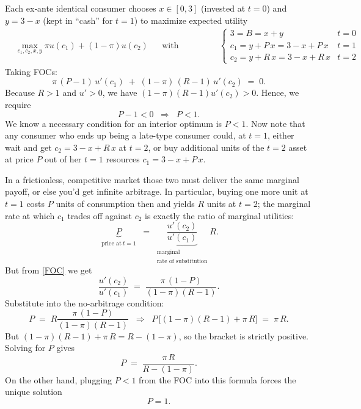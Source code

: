 \documentclass[12pt]{article}
\begin{document}
\begin{enumerate}[label=(\alph*)]
    Each ex‐ante identical consumer chooses $x\in[0,3]$ (invested at $t=0$) and $y=3-x$ (kept in “cash” for $t=1$) to maximize expected utility
    \begin{align*}
        &\max_{c_1, c_2, x,y} \pi u(c_1) + (1-\pi)u(c_2) && \text{with budget constraints:} && \begin{cases}
            3=B  =x+y & t=0
            \\ c_1 = y + P\,x = 3 - x + P\,x & t=1
            \\ c_2 = y + R\,x = 3 - x + R\,x & t=2
        \end{cases}
    \end{align*}
Taking FOCs:
\begin{equation}
    \pi\,(P-1)\,u'(c_1)\;+\;(1-\pi)\,(R-1)\,u'(c_2)\;=\;0.
\label{FOC}
\end{equation}
Because $R>1$ and $u'>0$, we have $(1-\pi)(R-1)u'(c_2)>0$.  Hence, we require
$$
P-1<0
\;\;\Longrightarrow\;\;
P<1.
$$
We know a necessary condition for an interior optimum is $P<1$.
Now note that any consumer who ends up being a late-type consumer could, at $t=1$,
either wait and get $c_2=3 - x + R\,x$ at $t=2$,
or buy additional units of the $t=2$ asset at price $P$ out of her $t=1$ resources $c_1 = 3 - x + P\,x$.

In a frictionless, competitive market those two must deliver the same  marginal payoff, or else you’d get infinite arbitrage.  In particular, buying one more unit at $t=1$ costs $P$ units of consumption then and yields $R$ units at $t=2$; the marginal rate at which $c_1$ trades off against $c_2$ is exactly the ratio of marginal utilities:
\begin{equation}
    \underbrace{P}_{\substack{\text{price at}~t=1}}
\;=\;
\underbrace{\frac{u'(c_2)}{u'(c_1)}}_{\substack{\text{marginal}\\\text{rate of substitution}}}  R.
\label{No–arb}
\end{equation}
But from \eqref{FOC} we get
$$
\frac{u'(c_2)}{u'(c_1)}
\;=\;
\frac{\pi\,(1-P)}{(1-\pi)(R-1)}.
$$
Substitute  into the no-arbitrage condition:
$$
P
\;=\;
R 
\frac{\pi\,(1-P)}{(1-\pi)(R-1)}
\;\;\Longrightarrow\;\;
P\,\bigl[(1-\pi)(R-1) + \pi\,R \bigr]
\;=\;
\pi\,R.
$$
But $(1-\pi)(R-1) + \pi\,R = R - (1-\pi)$, so the bracket is strictly positive.  Solving for $P$ gives
$$
P \;=\;\frac{\pi\,R}{R - (1-\pi)}.
$$
On the other hand, plugging $P<1$ from the FOC into this formula forces the unique solution
$$
\boxed{P=1.}
$$


\end{enumerate}
\end{document}

